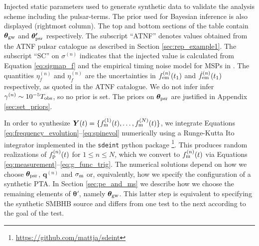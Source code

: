 \documentclass[fleqn,usenatbib,useAMS]{mnras}
\begin{document}
\begin{table}
		\caption{Injected static parameters used to generate synthetic data to validate the analysis scheme including the pulsar-terms. The prior used for Bayesian inference is also displayed (rightmost column).  The top and bottom sections of the table contain $\boldsymbol{\theta}_{\rm gw}$ and $\boldsymbol{\theta'}_{\rm psr}$ respectively. The subscript ``ATNF'' denotes values obtained from the ATNF pulsar catalogue as described in Section \ref{sec:rep_example1}. The subscript ``SC'' on $\sigma^{(n)}$ indicates that the injected value is calculated from Equation \eqref{eq:sigmap_f} and the empirical timing noise model for MSPs in \protect \cite{Shannon2010}. The quantities $\eta^{(n)}_{f}$ and $\eta^{(n)}_{\dot{f}}$ are the uncertainties in $f^{(n)}_{\rm em} (t_1)$ and $\dot{f}^{(n)}_{\rm em} (t_1)$ respectively, as quoted in the ATNF catalogue. We do not infer infer $\gamma^{(n)} \sim 10^{-5} T_{\rm obs}$, so no prior is set. The priors on $\boldsymbol{\theta}_{\rm psr}$ are justified in Appendix \ref{sec:set_priors}.
		}
		\label{tab:parameters_and_priors}
	\end{table}
In order to synthesize $\boldsymbol{Y}(t) = \{f_{\rm m}^{(1)}(t), \dots, f_{\rm m}^{(N)}(t) \}$, we integrate Equations \eqref{eq:frequency_evolution}--\eqref{eq:spinevol} numerically using a Runge-Kutta It$\hat{\text{o}}$ integrator implemented in the \texttt{sdeint} python package \footnote{\url{https://github.com/mattja/sdeint}}. This produces random realizations of $f_{\rm p}^{(n)}(t)$ for $1\leq n \leq N$, which we convert to $f_{\rm m}^{(n)}(t)$ via Equations \eqref{eq:measurement}--\eqref{eq:g_func_trig}. The numerical solutions depend on how we choose $\boldsymbol{\theta}_{\rm psr}$, ${\boldsymbol{q}}^{(n)}$ and $\sigma_{\rm m}$ or, equivalently, how we specify the configuration of a synthetic PTA. In Section  \ref{sec:pe_and_ms} we describe how we choose the remaining elements of $\boldsymbol{\theta}'$, namely $\boldsymbol{\theta}_{\rm gw}$. This latter step is equivalent to specifying the synthetic SMBHB source and differs from one test to the next according to the goal of the test.  \newline 
\end{document}
